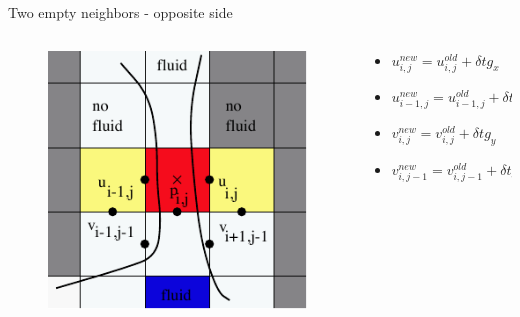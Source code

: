 \documentclass{beamer}
\begin{document}
	\begin{frame}{Two empty neighbors - opposite side}
	  \begin{columns}
	 	\begin{column}[c]{0.4\textwidth}
	 	\begin{figure}
			\includegraphics[width=1\textwidth]{pic/two2.pdf}
		 \end{figure}
		\end{column}
		\begin{column}[c]{0.6\textwidth}
				\begin{itemize}
					\item $ u_{i,j}^{new}= u_{i,j}^{old} +\delta t g_x $
					\item $ u_{i-1,j}^{new}= u_{i-1,j}^{old} +\delta t g_x $
					\item $ v_{i,j}^{new}= v_{i,j}^{old} +\delta t g_y $
					\item $ v_{i,j-1}^{new}= v_{i,j-1}^{old} +\delta t g_y $
				\end{itemize}
			\end{column}
		\end{columns}
	\end{frame}	
	
\end{document}
